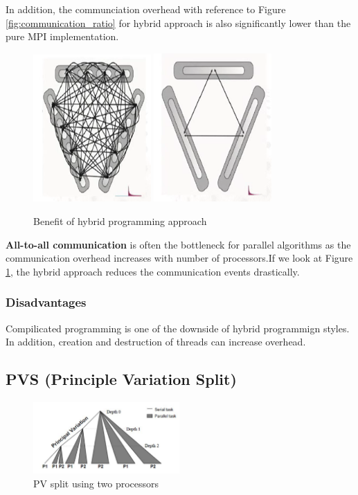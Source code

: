 \documentclass[12pt]{article}
\begin{document}
\noindent In addition, the communciation overhead with reference to Figure
\ref{fig:communication_ratio} for hybrid approach is also significantly lower
than the pure MPI implementation.


\begin{figure}[H]
  \centering
  \includegraphics[width=0.4\textwidth,
  height=0.3\textwidth]{alltoall1.png} \hfill
  \includegraphics[width=0.4\textwidth,
  height=0.3\textwidth]{alltoall2.png}
  \caption{Benefit of hybrid programming approach}
  \label{fig:alltoall}
\end{figure}

\noindent \textbf{All-to-all communication} is often the bottleneck for parallel
algorithms as the communication overhead increases with number of processors.If
we look at Figure \ref{fig:alltoall}, the hybrid approach reduces the
communication events drastically.

\subsubsection{Disadvantages}

Compilicated programming is one of the downside of hybrid programmign styles. In
addition, creation and destruction of threads can increase overhead.

\subsection{PVS (Principle Variation Split)}

\begin{figure}[H]
  \centering
  \includegraphics[width=0.5\textwidth, height=0.3\textwidth]{pvs.png}
  \caption{PV split using two processors}
  \label{fig:pvs}
\end{figure}
\end{document}
